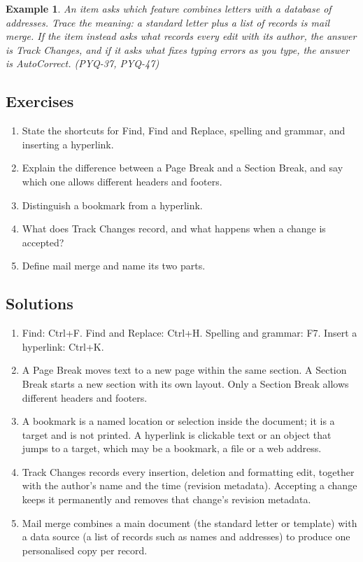 \documentclass[11pt]{article}
\newtheorem{example}{Example}[section]
\begin{document}
\begin{example}
An item asks which feature combines letters with a database of addresses.
Trace the meaning: a standard letter plus a list of records is mail merge. If
the item instead asks what records every edit with its author, the answer is
Track Changes, and if it asks what fixes typing errors as you type, the answer
is AutoCorrect. (PYQ-37, PYQ-47)
\end{example}

\subsection*{Exercises}
\begin{enumerate}[label=\arabic*.]
  \item State the shortcuts for Find, Find and Replace, spelling and grammar,
    and inserting a hyperlink.
  \item Explain the difference between a Page Break and a Section Break, and
    say which one allows different headers and footers.
  \item Distinguish a bookmark from a hyperlink.
  \item What does Track Changes record, and what happens when a change is
    accepted?
  \item Define mail merge and name its two parts.
\end{enumerate}

\subsection*{Solutions}
\begingroup\small
\begin{enumerate}[label=\arabic*.]
  \item Find: Ctrl+F. Find and Replace: Ctrl+H. Spelling and grammar: F7.
    Insert a hyperlink: Ctrl+K.
  \item A Page Break moves text to a new page within the same section. A
    Section Break starts a new section with its own layout. Only a Section
    Break allows different headers and footers.
  \item A bookmark is a named location or selection inside the document; it is
    a target and is not printed. A hyperlink is clickable text or an object
    that jumps to a target, which may be a bookmark, a file or a web address.
  \item Track Changes records every insertion, deletion and formatting edit,
    together with the author's name and the time (revision metadata). Accepting
    a change keeps it permanently and removes that change's revision metadata.
  \item Mail merge combines a main document (the standard letter or template)
    with a data source (a list of records such as names and addresses) to
    produce one personalised copy per record.
\end{enumerate}
\endgroup
\end{document}
